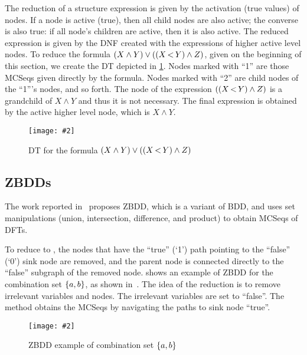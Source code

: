 \documentclass[12pt,openright,twoside,a4paper,oldfontcommands,english,brazil,final]{abntex2}
\theoremstyle{theo}
\newcommand{\includegraphicsaspectratio}[2][1]{%
  \texttt{[image: \#2]}%
}
\newcommand{\setsin}[1]{\ensuremath\left\{ #1 \right\}}
\newcommand{\parsin}[1]{\ensuremath\left( #1 \right)}
\def\pand{\ensuremath\operatorname{<}}
\begin{document}
The reduction of a structure expression is given by the activation (true values) of nodes.
If a node is active (true), then all child nodes are also active; the converse is also true: if all node's children are active, then it is also active.
The reduced expression is given by the \ac{DNF} created with the expressions of higher active level nodes.
To reduce the formula $\parsin{X \land Y} \lor \parsin{\parsin{X \pand Y} \land Z}$, given on the beginning of this section, we create the \ac{DT} depicted in \cref{fig:dependency-tree-reduction}.
Nodes marked with ``1'' are those \acp{MCSeq} given directly by the formula.
Nodes marked with ``2'' are child nodes of the ``1'''s nodes, and so forth.
The node of the expression $\parsin{\parsin{X \pand Y} \land Z}$ is a grandchild of $X \land Y$ and thus it is not necessary.
The final expression is obtained by the active higher level node, which is $X \land Y$.

\begin{figure}[htb]
  \centering
  \includegraphicsaspectratio[0.7]{dependency-tree-reduction}
  \caption{\acs*{DT} for the formula $\parsin{X \land Y} \lor \parsin{\parsin{X \pand Y} \land Z}$}
  \label{fig:dependency-tree-reduction}
\end{figure}

\subsection{\Aclp*{ZBDD}}
\label{sec:zbdd}

The work reported in~\cite{TD2004} proposes \acl{ZBDD}, which is a variant of \ac{BDD}, and uses set manipulations (union, intersection, difference, and product) to obtain \acp{MCSeq} of \acp{DFT}.

To reduce  to , the nodes that have the ``true'' (`1') path pointing to the ``false'' (`0') sink node are removed, and the parent node is connected directly to the ``false'' subgraph of the removed node.
 shows an example of \ac{ZBDD} for the combination set $\setsin{a,b}$, as shown in~\cite{TD2004}.
The idea of the reduction is to remove irrelevant variables and nodes.
The irrelevant variables are set to ``false''.
The method obtains the \acp{MCSeq} by navigating the paths to sink node ``true''.

\begin{figure}[htb]
  \centering
  \includegraphicsaspectratio[0.7]{bdd-zbdd-example}
  \caption{\acs*{ZBDD} example of combination set $\setsin{a,b}$}
  \label{fig:zbdd-example}
\end{figure}
\end{document}
